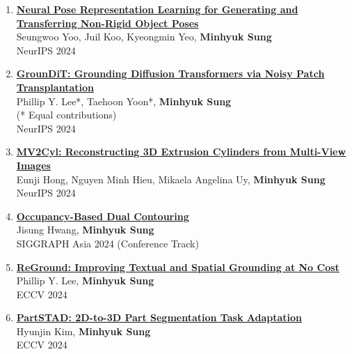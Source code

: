 \documentclass[letterpaper,10pt]{article} %
\newcommand{\blankline}{\quad\pagebreak[2]}
\begin{document}
{{\begin{enumerate}
\item \label{neurips24_3}
\href{https://arxiv.org/abs/2406.09728}{\textbf{Neural Pose Representation Learning for Generating and Transferring Non-Rigid Object Poses}}\\
Seungwoo Yoo, Juil Koo, Kyeongmin Yeo, \textbf{Minhyuk Sung}\\
NeurIPS 2024\\
\blankline

\item \label{neurips24_2}
\href{https://arxiv.org/abs/2410.20474}{\textbf{GrounDiT: Grounding Diffusion Transformers via Noisy Patch Transplantation}}\\
Phillip Y. Lee*, Taehoon Yoon*, \textbf{Minhyuk Sung}\\
(* Equal contributions)\\
NeurIPS 2024\\
\blankline

\item \label{neurips24_1}
\href{https://arxiv.org/abs/2406.10853}{\textbf{MV2Cyl: Reconstructing 3D Extrusion Cylinders from Multi-View Images}}\\
Eunji Hong, Nguyen Minh Hieu, Mikaela Angelina Uy, \textbf{Minhyuk Sung}\\
NeurIPS 2024\\
\blankline

\item \label{siggraphasia24}
\href{https://arxiv.org/abs/2409.13418}{\textbf{Occupancy-Based Dual Contouring}}\\
Jisung Hwang, \textbf{Minhyuk Sung}\\
SIGGRAPH Asia 2024 (Conference Track)\\
\blankline

\item \label{eccv24_2}
\href{https://arxiv.org/abs/2403.13589}{\textbf{ReGround: Improving Textual and Spatial Grounding at No Cost}}\\
Phillip Y. Lee, \textbf{Minhyuk Sung}\\
ECCV 2024\\
\blankline

\item \label{eccv24_1}
\href{https://arxiv.org/abs/2401.05906}{\textbf{PartSTAD: 2D-to-3D Part Segmentation Task Adaptation}}\\
Hyunjin Kim, \textbf{Minhyuk Sung}\\
ECCV 2024\\
\blankline


\end{enumerate}}}
\end{document}
